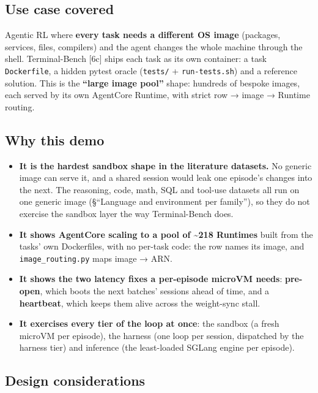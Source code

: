 \documentclass[
  paper=a4,
  ,captions=tableheading
]{scrartcl}
\providecommand{\tightlist}{%
  \setlength{\itemsep}{0pt}\setlength{\parskip}{0pt}}
\begin{document}
\hypertarget{use-case-covered}{%
\subsection{Use case covered}\label{use-case-covered}}

Agentic RL where \textbf{every task needs a different OS image}
(packages, services, files, compilers) and the agent changes the whole
machine through the shell. Terminal-Bench {[}6c{]} ships each task as
its own container: a task \texttt{Dockerfile}, a hidden pytest oracle
(\texttt{tests/} + \texttt{run-tests.sh}) and a reference solution. This
is the \textbf{``large image pool''} shape: hundreds of bespoke images,
each served by its own AgentCore Runtime, with strict row → image →
Runtime routing.

\hypertarget{why-this-demo}{%
\subsection{Why this demo}\label{why-this-demo}}

\begin{itemize}
\tightlist
\item
  \textbf{It is the hardest sandbox shape in the literature datasets.}
  No generic image can serve it, and a shared session would leak one
  episode's changes into the next. The reasoning, code, math, SQL and
  tool-use datasets all run on one generic image (§``Language and
  environment per family''), so they do not exercise the sandbox layer
  the way Terminal-Bench does.
\item
  \textbf{It shows AgentCore scaling to a pool of \textasciitilde218
  Runtimes} built from the tasks' own Dockerfiles, with no per-task
  code: the row names its image, and \texttt{image\_routing.py} maps
  image → ARN.
\item
  \textbf{It shows the two latency fixes a per-episode microVM needs}:
  \textbf{pre-open}, which boots the next batches' sessions ahead of
  time, and a \textbf{heartbeat}, which keeps them alive across the
  weight-sync stall.
\item
  \textbf{It exercises every tier of the loop at once}: the sandbox (a
  fresh microVM per episode), the harness (one loop per session,
  dispatched by the harness tier) and inference (the least-loaded SGLang
  engine per episode).
\end{itemize}

\hypertarget{design-considerations}{%
\subsection{Design considerations}\label{design-considerations}}
\end{document}
